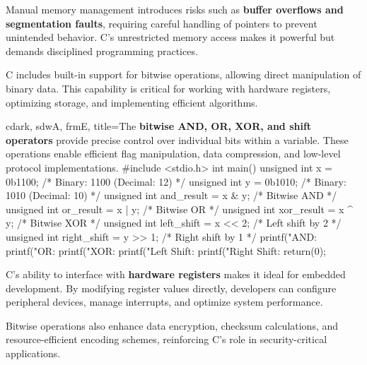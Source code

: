 \bigskip

\begin{NxSSSSBox}[breakable]
	\begin{NxIDBox}
		Manual memory management introduces risks such as \textbf{buffer overflows and segmentation faults}, requiring careful handling of pointers to prevent unintended behavior. C’s unrestricted memory access makes it powerful but demands disciplined programming practices.
	\end{NxIDBox}
\end{NxSSSSBox}

\begin{NxSSSSBox}
	\begin{NxIDBox}
		C includes built-in support for bitwise operations, allowing direct manipulation of binary data. This capability is critical for working with hardware registers, optimizing storage, and implementing efficient algorithms.
	\end{NxIDBox}
\end{NxSSSSBox}

\begin{NxCodeBox}{c}{dark, sdwA, frmE, title={The \textbf{bitwise AND, OR, XOR, and shift operators} provide precise control over individual bits within a variable. These operations enable efficient flag manipulation, data compression, and low-level protocol implementations.}}
	#include <stdio.h>
	int main() {
		unsigned int x = 0b1100;  /* Binary: 1100 (Decimal: 12) */
		unsigned int y = 0b1010;  /* Binary: 1010 (Decimal: 10) */
		unsigned int and_result = x & y;  /* Bitwise AND */
		unsigned int or_result  = x | y;  /* Bitwise OR */
		unsigned int xor_result = x ^ y;  /* Bitwise XOR */
		unsigned int left_shift = x << 2; /* Left shift by 2 */
		unsigned int right_shift = y >> 1; /* Right shift by 1 */
		printf("AND: %
		printf("OR: %
		printf("XOR: %
		printf("Left Shift: %
		printf("Right Shift: %
		return(0);
	}
\end{NxCodeBox}

\bigskip

\begin{NxSSSSBox}[breakable]
	\begin{NxIDBox}
		C's ability to interface with \textbf{hardware registers} makes it ideal for embedded development. By modifying register values directly, developers can configure peripheral devices, manage interrupts, and optimize system performance.
	\end{NxIDBox}
	\begin{NxIDBox}
		Bitwise operations also enhance data encryption, checksum calculations, and resource-efficient encoding schemes, reinforcing C’s role in security-critical applications.
	\end{NxIDBox}
\end{NxSSSSBox}

